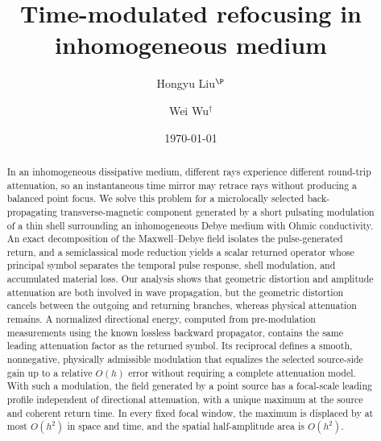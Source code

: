 \documentclass[11pt,reqno]{amsart}
\numberwithin{equation}{section}
\begin{document}
\title[Time-modulated refocusing in inhomogeneous medium]{Time-modulated refocusing in inhomogeneous medium}

\author[Hongyu Liu]{Hongyu Liu$^\P$ }

\address{Department of Mathematics, City University of Hong Kong, Hong Kong SAR, China}


\author[Wei Wu]{Wei Wu$^\dag$} \address{School of Mathematics, Jilin University, 2699 Qianjin Street, 130012 Changchun, China}


\date{\today} \subjclass{} \keywords{}

\begin{abstract}

In an inhomogeneous dissipative medium, different rays experience different round-trip attenuation, so an instantaneous time mirror may retrace rays without producing a balanced point focus. We solve this problem for a microlocally selected back-propagating transverse-magnetic component generated by a short pulsating modulation of a thin shell surrounding an inhomogeneous Debye medium with Ohmic conductivity. An exact decomposition of the Maxwell--Debye field isolates the pulse-generated return, and a semiclassical mode reduction yields a scalar returned operator whose principal symbol separates the temporal pulse response, shell modulation, and accumulated material loss. Our analysis shows that geometric distortion and amplitude attenuation are both involved in wave propagation, but the geometric distortion cancels between the outgoing and returning branches, whereas physical attenuation remains. A normalized directional energy, computed from pre-modulation measurements using the known lossless backward propagator, contains the same leading attenuation factor as the returned symbol. Its reciprocal defines a smooth, nonnegative, physically admissible modulation that equalizes the selected source-side gain up to a relative $O(h)$ error without requiring a complete attenuation model. With such a modulation, the field generated by a point source has a focal-scale leading profile independent of directional attenuation, with a unique maximum at the source and coherent return time. In every fixed focal window, the maximum is displaced by at most $O(h^2)$ in space and time, and the spatial half-amplitude area is $O(h^2)$.

\end{abstract}
\end{document}

